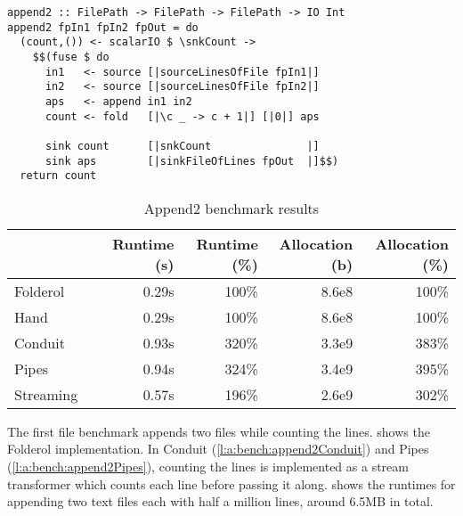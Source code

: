\begin{lstlisting}[float,label=l:bench:append2Folderol,caption=Folderol implementation of \Hs/append2/]
append2 :: FilePath -> FilePath -> FilePath -> IO Int
append2 fpIn1 fpIn2 fpOut = do
  (count,()) <- scalarIO $ \snkCount ->
    $$(fuse $ do
      in1   <- source [|sourceLinesOfFile fpIn1|]
      in2   <- source [|sourceLinesOfFile fpIn2|]
      aps   <- append in1 in2
      count <- fold   [|\c _ -> c + 1|] [|0|] aps

      sink count      [|snkCount               |]
      sink aps        [|sinkFileOfLines fpOut  |]$$)
  return count
\end{lstlisting}
\begin{table}
\begin{center}
\begin{tabular}{ll|rrrr}
& & Runtime (s)  & Runtime (\%) & Allocation (b) & Allocation (\%) \\
\hline
Folderol &          & 0.29s &   100\% & 8.6e8 & 100\% \\
Hand     &          & 0.29s &   100\% & 8.6e8 & 100\% \\
Conduit &           & 0.93s &   320\% & 3.3e9 & 383\% \\
Pipes  &            & 0.94s &   324\% & 3.4e9 & 395\% \\
Streaming &         & 0.57s &   196\% & 2.6e9 & 302\% \\
\end{tabular}
\end{center}
\caption[Append2 benchmark results]{Append2 benchmark results}
\label{table:bench:append2}
\end{table}


The first file benchmark appends two files while counting the lines.
 shows the Folderol implementation.
In Conduit (\cref{l:a:bench:append2Conduit}) and Pipes (\cref{l:a:bench:append2Pipes}), counting the lines is implemented as a stream transformer which counts each line before passing it along.
 shows the runtimes for appending two text files each with half a million lines, around 6.5MB in total.



